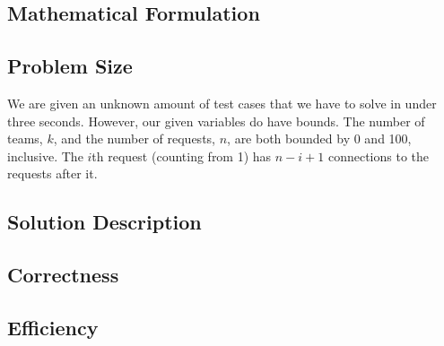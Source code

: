 \documentclass[12pt]{article}
\begin{document}
\subsection{Mathematical Formulation}

\subsection{Problem Size}

We are given an unknown amount of test cases that we have to solve in under
three seconds. However, our given variables do have bounds. The number
of teams, $k$, and the number of requests, $n$, are both bounded by
0 and 100, inclusive. The $i$th request (counting from 1) has $n - i + 1$
connections to the requests after it.

\subsection{Solution Description}

\subsection{Correctness}

\subsection{Efficiency}

\end{document}
